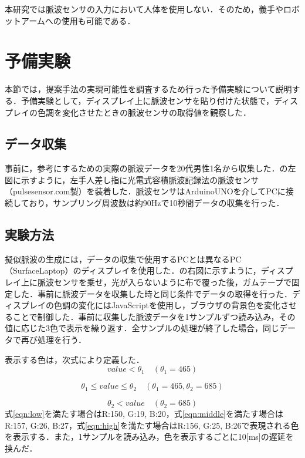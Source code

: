 \documentclass[submit,techrep]{ipsj}
\begin{document}
本研究では脈波センサの入力において人体を使用しない．そのため，義手やロボットアームへの使用も可能である．





\section{予備実験}
\label{preliminary}
本節では，提案手法の実現可能性を調査するため行った予備実験について説明する．予備実験として，ディスプレイ上に脈波センサを貼り付けた状態で，ディスプレイの色調を変化させたときの脈波センサの取得値を観察した．


\subsection{データ収集}
事前に，参考にするための実際の脈波データを20代男性1名から収集した．の左図に示すように，左手人差し指に光電式容積脈波記録法の脈波センサ（pulsesensor.com製）を装着した．脈波センサはArduinoUNOを介してPCに接続しており，サンプリング周波数は約90Hzで10秒間データの収集を行った．


\subsection{実験方法}
擬似脈波の生成には，データの収集で使用するPCとは異なるPC（SurfaceLaptop）のディスプレイを使用した．の右図に示すように，ディスプレイ上に脈波センサを乗せ，光が入らないように布で覆った後，ガムテープで固定した．事前に脈波データを収集した時と同じ条件でデータの取得を行った．ディスプレイの色調の変化にはJavaScriptを使用し，ブラウザの背景色を変化させることで制御した．事前に収集した脈波データを1サンプルずつ読み込み，その値に応じた3色で表示を繰り返す．全サンプルの処理が終了した場合，同じデータで再び処理を行う．
\par

表示する色は，次式により定義した．
\begin{equation}
	\label{eqn:low}
	value < \theta_{1} \quad (\theta_{1}=465)
\end{equation}

\begin{equation}
	\label{eqn:middle}
	\theta_{1} \leq value \leq \theta_{2} \quad (\theta_{1}=465, \theta_{2}=685)
\end{equation}

\begin{equation}
	\label{eqn:high}
	\theta_{2} < value \quad (\theta_{2}=685)
\end{equation}
式\ref{eqn:low}を満たす場合はR:150, G:19, B:20，式\ref{eqn:middle}を満たす場合はR:157, G:26, B:27，式\ref{eqn:high}を満たす場合はR:156, G:25, B:26で表現される色を表示する．また，1サンプルを読み込み，色を表示するごとに10[ms]の遅延を挟んだ．
\end{document}
